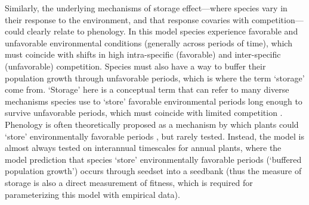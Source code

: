 Similarly, the underlying mechanisms of storage effect---where species vary in their response to the environment, and that response covaries with competition---could clearly relate to phenology. In this model species experience favorable and unfavorable environmental conditions (generally across periods of time), which must coincide with shifts in high intra-specific (favorable) and inter-specific (unfavorable) competition. Species must also have a way to buffer their population growth through unfavorable periods, which is where the term `storage' come from. `Storage' here is a conceptual term that can refer to many diverse mechanisms species use to `store' favorable environmental periods long enough to survive unfavorable periods, which must coincide with limited competition \citep{Chesson:2000vd}. Phenology is often theoretically proposed as a mechanism by which plants could `store' environmentally favorable periods \citep{Chesson:1993gi,Chesson:2004eo}, but rarely tested. Instead, the model is almost always tested on interannual timescales for annual plants, where the model prediction that species `store' environmentally favorable periods (`buffered population growth') occurs through seedset into a seedbank (thus the measure of storage is also a direct measurement of fitness, which is required for parameterizing this model with empirical data). 


